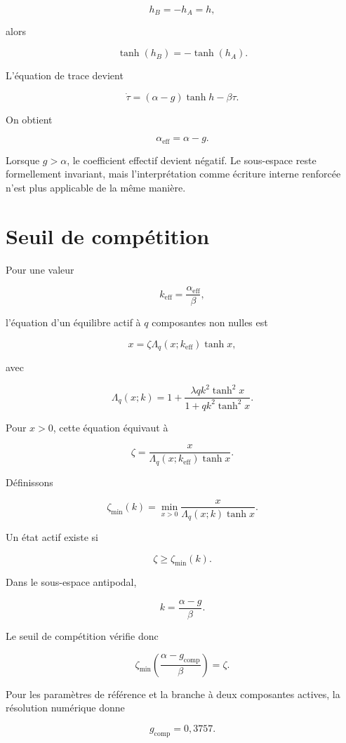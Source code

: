 \[
h_B=-h_A=h,
\]

alors

\[
\tanh(h_B)=-\tanh(h_A).
\]

L'équation de trace devient

\[
\dot\tau
=
(\alpha-g)\tanh h
-
\beta\tau.
\]

On obtient

\[
\boxed{
\alpha_{\mathrm{eff}}
=
\alpha-g.
}
\]

Lorsque \(g>\alpha\), le coefficient effectif devient négatif. Le
sous-espace reste formellement invariant, mais l'interprétation comme
écriture interne renforcée n'est plus applicable de la même manière.

\section{Seuil de compétition}
\label{annexe-resistance-seuil-competition}

Pour une valeur

\[
k_{\mathrm{eff}}
=
\frac{\alpha_{\mathrm{eff}}}{\beta},
\]

l'équation d'un équilibre actif à \(q\) composantes non nulles est

\[
x
=
\zeta
\Lambda_q(x;k_{\mathrm{eff}})
\tanh x,
\]

avec

\[
\Lambda_q(x;k)
=
1+
\frac{
\lambda qk^2\tanh^2x
}{
1+qk^2\tanh^2x
}.
\]

Pour \(x>0\), cette équation équivaut à

\[
\zeta
=
\frac{x}
{
\Lambda_q(x;k_{\mathrm{eff}})
\tanh x
}.
\]

Définissons

\[
\boxed{
\zeta_{\min}(k)
=
\min_{x>0}
\frac{x}
{
\Lambda_q(x;k)\tanh x
}.
}
\]

Un état actif existe si

\[
\zeta\geq\zeta_{\min}(k).
\]

Dans le sous-espace antipodal,

\[
k
=
\frac{\alpha-g}{\beta}.
\]

Le seuil de compétition vérifie donc

\[
\boxed{
\zeta_{\min}
\left(
\frac{\alpha-g_{\mathrm{comp}}}{\beta}
\right)
=
\zeta.
}
\]

Pour les paramètres de référence et la branche à deux composantes
actives, la résolution numérique donne

\[
\boxed{
g_{\mathrm{comp}}
=
0{,}3757.
}
\]

